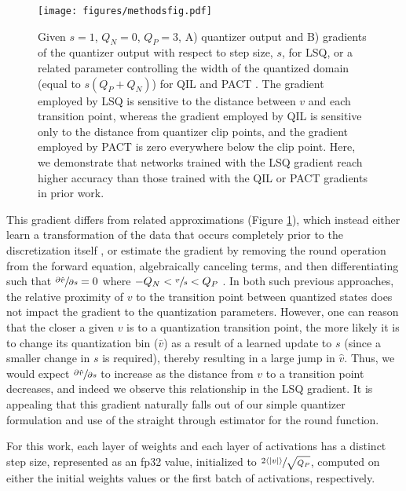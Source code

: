 \documentclass{article}
\begin{document}
\begin{figure}[ht]
\begin{center}
  	\centerline{\texttt{[image: figures/methodsfig.pdf]}}
	\caption{Given $s=1$, $Q_N=0$, $Q_P=3$, A) quantizer output and B)
gradients of the quantizer output with respect to step size, $s$, for LSQ, or a related parameter controlling the width of the quantized domain (equal to $s(Q_P+Q_N)$) for QIL \citep{jung2018joint} and PACT \citep{choi2018pact}.
The gradient employed by LSQ is sensitive to the distance between $v$ and each transition point,
whereas the gradient employed by QIL \citep{jung2018joint} is sensitive only to the distance from quantizer clip points,
and the gradient employed by PACT \citep{choi2018pact} is zero everywhere below the clip point.
Here, we demonstrate that networks trained with the LSQ gradient reach higher accuracy than those trained with the QIL or PACT gradients in prior work.
	}
	\label{fig:gradients}
  	\end{center}
\end{figure}

This gradient differs from related approximations (Figure \ref{fig:gradients}),
which instead either learn a transformation of the data that occurs completely prior to the discretization itself \citep{jung2018joint}, or estimate the gradient by removing the round operation from the forward equation, algebraically canceling terms, and then differentiating such that $\sfrac{\partial{\hat{v}}}{\partial{s}}=0$ where $-Q_N < \sfrac{v}{s} < Q_P$ \citep{choi2018pact,choi2018bridging}.
In both such previous approaches, the relative proximity of $v$ to the transition point between quantized states does not impact the gradient to the quantization parameters.
However, one can reason that the closer a given $v$ is to a quantization transition point, the more likely it is to change its quantization bin ($\bar{v}$) as a result of a learned update to $s$ (since a smaller change in $s$ is required), thereby resulting in a large jump in $\hat{v}$.  Thus, we would expect $\sfrac{\partial{\hat{v}}}{\partial{s}}$ to increase as the distance from $v$ to a transition point decreases, and indeed we observe this relationship in the LSQ gradient.  It is appealing that this gradient naturally falls out of our simple quantizer formulation and use of the straight through estimator for the round function.



For this work, each layer of weights and each layer of activations has a distinct step size, represented as an fp32 value, initialized to $\sfrac{2\langle|v|\rangle}{\sqrt{Q_P}}$, computed on either the initial weights values or the first batch of activations, respectively.
\end{document}

